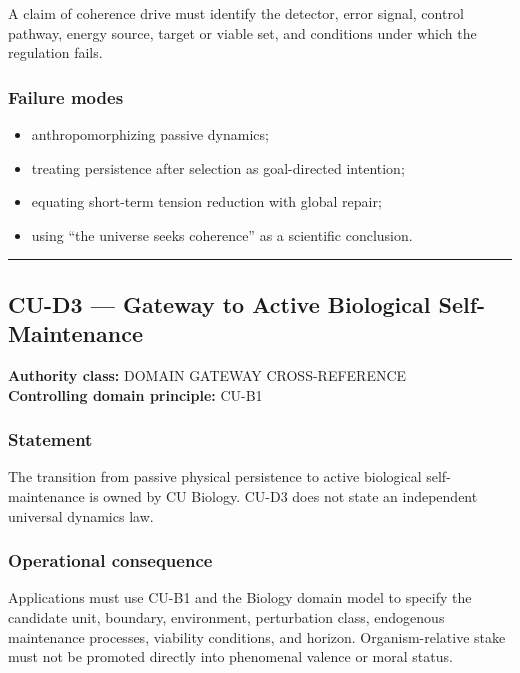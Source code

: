 \documentclass[
  11pt,
]{article}
\providecommand{\tightlist}{%
  \setlength{\itemsep}{0pt}\setlength{\parskip}{0pt}}
\begin{document}
A claim of coherence drive must identify the detector, error signal,
control pathway, energy source, target or viable set, and conditions
under which the regulation fails.

\subsubsection{Failure modes}\label{failure-modes-16}

\begin{itemize}
\tightlist
\item
  anthropomorphizing passive dynamics;
\item
  treating persistence after selection as goal-directed intention;
\item
  equating short-term tension reduction with global repair;
\item
  using ``the universe seeks coherence'' as a scientific conclusion.
\end{itemize}

\begin{center}\rule{0.5\linewidth}{0.5pt}\end{center}

\subsection{CU-D3 --- Gateway to Active Biological
Self-Maintenance}\label{cu-d3-gateway-to-active-biological-self-maintenance}

\textbf{Authority class:} DOMAIN GATEWAY CROSS-REFERENCE\\
\textbf{Controlling domain principle:} CU-B1

\subsubsection{Statement}\label{statement-43}

The transition from passive physical persistence to active biological
self-maintenance is owned by CU Biology. CU-D3 does not state an
independent universal dynamics law.

\subsubsection{Operational
consequence}\label{operational-consequence-25}

Applications must use CU-B1 and the Biology domain model to specify the
candidate unit, boundary, environment, perturbation class, endogenous
maintenance processes, viability conditions, and horizon.
Organism-relative stake must not be promoted directly into phenomenal
valence or moral status.
\end{document}
